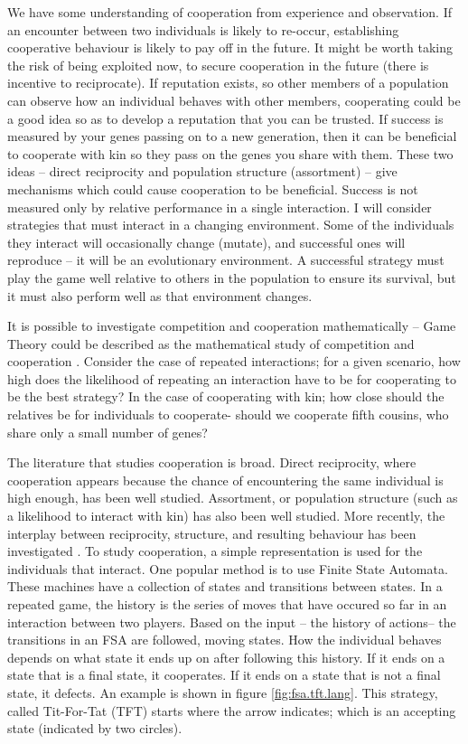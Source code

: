 \documentclass[a4paper,11pt,bcshonoursthesis,singlespace,oneside,thesisdraft,pdflatex]{cssethesis}
\renewcommand{\cite}{\citep} %
\begin{document}
We have some understanding of cooperation from experience and observation. 
If an encounter between two individuals is likely to re-occur, establishing cooperative behaviour is likely to pay off in the future. 
It might be worth taking the risk of being exploited now, to secure cooperation in the future (there is incentive to reciprocate). 
If reputation exists, so other members of a population can observe how an individual behaves with other members, cooperating could be a good idea so as to develop a reputation that you can be trusted. 
If success is measured by your genes passing on to a new generation, then it can be beneficial to cooperate with kin so they pass on the genes you share with them. 
These two ideas -- direct reciprocity and population structure (assortment) -- give mechanisms which could cause cooperation to be beneficial. 
Success is not measured only by relative performance in a single interaction. 
I will consider strategies that must interact in a changing environment. 
Some of the individuals they interact will occasionally change (mutate), and successful ones will reproduce -- it will be an evolutionary environment. 
A successful strategy must play the game well relative to others in the population to ensure its survival, but it must also perform well as that environment changes.

It is possible to investigate competition and cooperation mathematically -- Game Theory could be described as the mathematical study of competition and cooperation \citep{binmore2007playing}. 
Consider the case of repeated interactions; for a given scenario, how high does the likelihood of repeating an interaction have to be for cooperating to be the best strategy? 
In the case of cooperating with kin; how close should the relatives be for individuals to cooperate- should we cooperate fifth cousins, who share only a small number of genes? 

The literature that studies cooperation is broad. Direct reciprocity, where cooperation appears because the chance of encountering the same individual is high enough, has been well studied. 
Assortment, or population structure (such as a likelihood to interact with kin) has also been well studied. 
More recently, the interplay between reciprocity, structure, and resulting behaviour has been investigated \cite{van-veelen:PNAS:2012}. 
To study cooperation, a simple representation is used for the individuals that interact. One popular method is to use Finite State Automata. 
These machines have a collection of states and transitions between states. 
In a repeated game, the history is the series of moves that have occured so far in an interaction between two players. 
Based on the input -- the history of actions-- the transitions in an FSA are followed, moving states. 
How the individual behaves depends on what state it ends up on after following this history. 
If it ends on a state that is a final state, it cooperates. If it ends on a state that is not a final state, it defects. An example is shown in figure \ref{fig:fsa.tft.lang}. This strategy, called Tit-For-Tat (TFT) starts where the arrow indicates; which is an accepting state (indicated by two circles).
\end{document}
